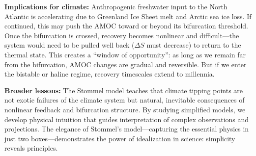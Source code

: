 \documentclass[12pt,letterpaper]{article}
\begin{document}
\noindent \textbf{Implications for climate:} Anthropogenic freshwater input to the North Atlantic is accelerating due to Greenland Ice Sheet melt and Arctic sea ice loss. If continued, this may push the AMOC toward or beyond its bifurcation threshold. Once the bifurcation is crossed, recovery becomes nonlinear and difficult---the system would need to be pulled well back ($\Delta S$ must decrease) to return to the thermal state. This creates a ``window of opportunity'': as long as we remain far from the bifurcation, AMOC changes are gradual and reversible. But if we enter the bistable or haline regime, recovery timescales extend to millennia.

\noindent \textbf{Broader lessons:} The Stommel model teaches that climate tipping points are not exotic failures of the climate system but natural, inevitable consequences of nonlinear feedback and bifurcation structure. By studying simplified models, we develop physical intuition that guides interpretation of complex observations and projections. The elegance of Stommel's model---capturing the essential physics in just two boxes---demonstrates the power of idealization in science: simplicity reveals principles.

\newpage
\end{document}

